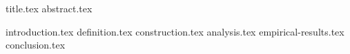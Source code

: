 \documentclass[11pt]{llncs}
\begin{document}
{title.tex}
\thispagestyle{plain}
{abstract.tex}

{introduction.tex}
{definition.tex}
{construction.tex}
{analysis.tex}
{empirical-results.tex}
{conclusion.tex}


\end{document}
